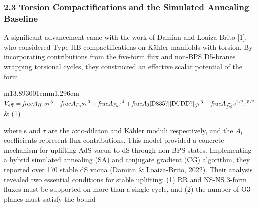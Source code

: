 \documentclass{article}
\begin{document}
\subsubsection{2.3 Torsion Compactifications and the Simulated Annealing Baseline}
A significant advancement came with the work of Damian and Loaiza-Brito [1], who considered Type IIB compactifications
on Kähler manifolds with torsion. By incorporating contributions from the five-form flux and non-BPS D5-branes wrapping
torsional cycles, they constructed an effective scalar potential of the form

\begin{center}
\tablefirsthead{}
\tablehead{}
\tabletail{}
\tablelasttail{}
\begin{supertabular}{m{13.893001cm}m{1.296cm}}
 $V_{\mathit{eff}\text{\hspace{0pt}}}=\mathit{frac}A_{H_3}\text{\hspace{0pt}}\text{\hspace{0pt}}s\tau
^3\text{\hspace{0pt}}+\mathit{frac}A_{F_3}s\tau
^3\text{\hspace{0pt}}\text{\hspace{0pt}}\text{\hspace{0pt}}+\mathit{frac}A_{F_5}\tau
^4\text{\hspace{0pt}}\text{\hspace{0pt}}+\mathit{frac}A_3\text{[D835?][DCDD?]}_3\tau
^3\text{\hspace{0pt}}\text{\hspace{0pt}}+\mathit{frac}A_{\widehat {\mathit{D5}}}\text{\hspace{0pt}}s^{1/2}\tau ^{5/2}$ 
&
(1)\\
\end{supertabular}
\end{center}
where s and $\tau $ are the axio-dilaton and Kähler moduli respectively, and the  $A_i$\hspace{0pt} coefficients
represent flux contributions. This model provided a concrete mechanism for uplifting AdS vacua to dS through non-BPS
states. Implementing a hybrid simulated annealing (SA) and conjugate gradient (CG) algorithm, they reported over 170
stable dS vacua (Damian \& Loaiza-Brito, 2022). Their analysis revealed two essential conditions for stable uplifting:
(1) RR and NS-NS 3-form fluxes must be supported on more than a single cycle, and (2) the number of O3-planes must
satisfy the bound
\end{document}
